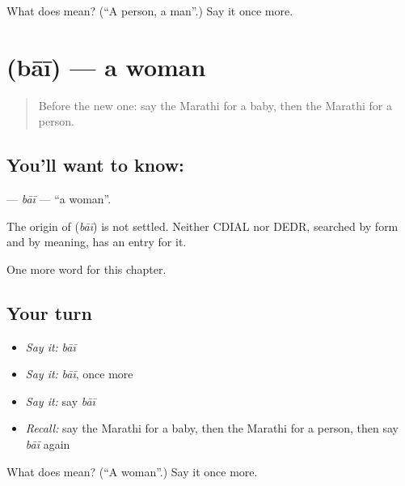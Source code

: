 \begin{tcolorbox}[breakable,colback=teal!4,colframe=teal!35!black,title={Before you move on}]
What does  mean? (\textquotedblleft{}A person, a man\textquotedblright{}.) Say it once more.
\end{tcolorbox}
\section[\texorpdfstring{\mr{बाई} (bāī)}{बाई (bāī)}]{ (bāī) — a woman}

\label{lesson:MR-C76-bai}



\begin{quote}
Before the new one: say the Marathi for a baby, then the Marathi for a person.
\end{quote}

\subsection*{You'll want to know: }
\textbf{} — \emph{bāī} — \textquotedblleft{}a woman\textquotedblright{}.

\begin{cousinweb}
The origin of \textbf{} (\emph{bāī}) is not settled. Neither CDIAL nor DEDR, searched by form and by meaning, has an entry for it.
\end{cousinweb}

\begin{grammarlens}[title={What you've built}]
One more word for this chapter.
\end{grammarlens}

\subsection*{Your turn}
\begin{itemize}
\raggedright
  \item \emph{Say it:} \emph{bāī}
  \item \emph{Say it:} \emph{bāī}, once more
  \item \emph{Say it:} say \emph{bāī}
  \item \emph{Recall:} say the Marathi for a baby, then the Marathi for a person, then say \emph{bāī} again
\end{itemize}

\begin{tcolorbox}[breakable,colback=teal!4,colframe=teal!35!black,title={Before you move on}]
What does  mean? (\textquotedblleft{}A woman\textquotedblright{}.) Say it once more.
\end{tcolorbox}

